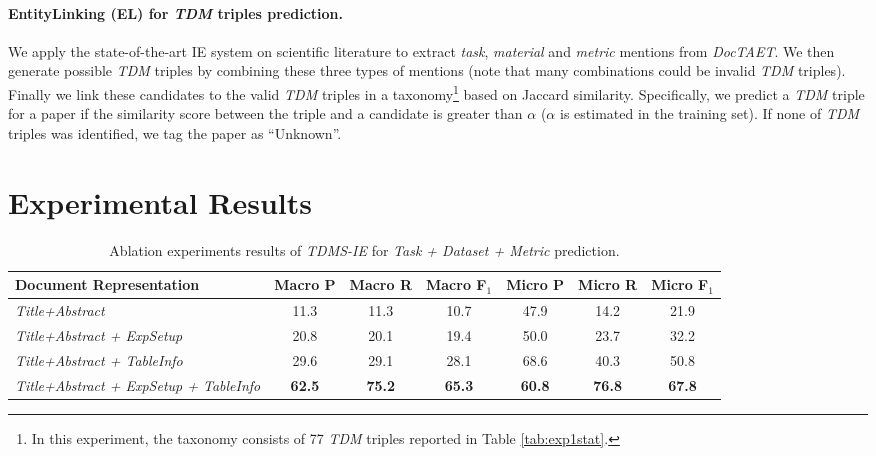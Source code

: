 \documentclass[11pt,a4paper]{article}
\begin{document}
\paragraph{EntityLinking (EL) for \emph{TDM} triples prediction.} We apply the state-of-the-art IE system on scientific literature \cite{Luan2018} 
to extract \emph{task}, \emph{material} and \emph{metric} mentions from \emph{DocTAET}. We then generate possible \emph{TDM} triples by combining these three types of mentions (note that many combinations could be invalid \emph{TDM} triples). Finally we link these candidates to the valid \emph{TDM} triples in a taxonomy\footnote{In this experiment, the taxonomy consists of 77 \emph{TDM} triples reported in Table \ref{tab:exp1stat}.} based on Jaccard similarity.  Specifically, we predict a \emph{TDM} triple for a paper if the similarity score between the triple and a candidate is greater than $\alpha$ ($\alpha$ is estimated in the training set). If none of \emph{TDM} triples was identified, we tag the paper as ``Unknown''.











\section{Experimental Results}\label{sec:results}


\begin{table*}[t]
\begin{center}
\begin{small}
\begin{tabular}{lcccccc}
\hline
Document Representation&Macro P&Macro R&Macro F$_1$&Micro P&Micro R&Micro F$_1$\\ \hline
\emph{Title+Abstract}&11.3&11.3&10.7&47.9&14.2&21.9 \\
\emph{Title+Abstract + ExpSetup}&20.8&20.1&19.4&50.0&23.7&32.2 \\
\emph{Title+Abstract + TableInfo}&29.6&29.1&28.1&68.6&40.3&50.8 \\
\emph{Title+Abstract + ExpSetup + TableInfo}&\textbf{62.5}&\textbf{75.2}&\textbf{65.3}&\textbf{60.8}&\textbf{76.8}&\textbf{67.8} \\
 \hline
\end{tabular}
\end{small}
\end{center}
\caption{\label{tab:exp1ablation}  Ablation experiments results of  \emph{TDMS-IE} for \emph{Task + Dataset + Metric} prediction.}
\end{table*}
\end{document}
